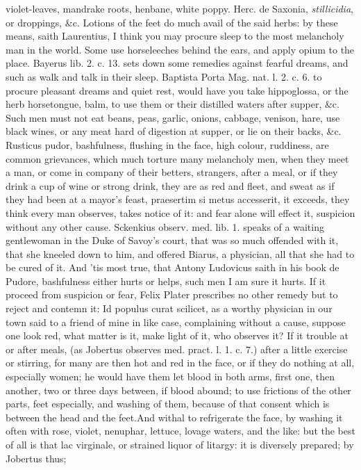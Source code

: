 violet-leaves, mandrake roots, henbane, white poppy. Herc. de Saxonia,
\emph{stillicidia}, or droppings, \&c. Lotions of the feet do much avail of
the said herbs: by these means, saith Laurentius, I think you may
procure sleep to the most melancholy man in the world. Some use
horseleeches behind the ears, and apply opium to the place.
Bayerus lib. 2. c. 13. sets down some remedies against fearful
dreams, and such as walk and talk in their sleep. Baptista Porta Mag.
nat. l. 2. c. 6. to procure pleasant dreams and quiet rest, would have
you take hippoglossa, or the herb horsetongue, balm, to use them or
their distilled waters after supper, \&c. Such men must not eat beans,
peas, garlic, onions, cabbage, venison, hare, use black wines, or any
meat hard of digestion at supper, or lie on their backs, \&c.
Rusticus pudor, bashfulness, flushing in the face, high colour,
ruddiness, are common grievances, which much torture many melancholy
men, when they meet a man, or come in company of their betters,
strangers, after a meal, or if they drink a cup of wine or strong
drink, they are as red and fleet, and sweat as if they had been at a
mayor's feast, praesertim si metus accesserit, it exceeds, they
think every man observes, takes notice of it: and fear alone will
effect it, suspicion without any other cause. Sckenkius observ. med.
lib. 1. speaks of a waiting gentlewoman in the Duke of Savoy's court,
that was so much offended with it, that she kneeled down to him, and
offered Biarus, a physician, all that she had to be cured of it. And
'tis most true, that Antony Ludovicus saith in his book de
Pudore, bashfulness either hurts or helps, such men I am sure it hurts.
If it proceed from suspicion or fear, Felix Plater prescribes no
other remedy but to reject and contemn it: Id populus curat scilicet,
as a worthy physician in our town said to a friend of mine in
like case, complaining without a cause, suppose one look red, what
matter is it, make light of it, who observes it?
If it trouble at or after meals, (as Jobertus observes med.
pract. l. 1. c. 7.) after a little exercise or stirring, for many are
then hot and red in the face, or if they do nothing at all, especially
women; he would have them let blood in both arms, first one, then
another, two or three days between, if blood abound; to use frictions
of the other parts, feet especially, and washing of them, because of
that consent which is between the head and the feet.And withal to
refrigerate the face, by washing it often with rose, violet, nenuphar,
lettuce, lovage waters, and the like: but the best of all is that lac
virginale, or strained liquor of litargy: it is diversely prepared; by
Jobertus thus; 

